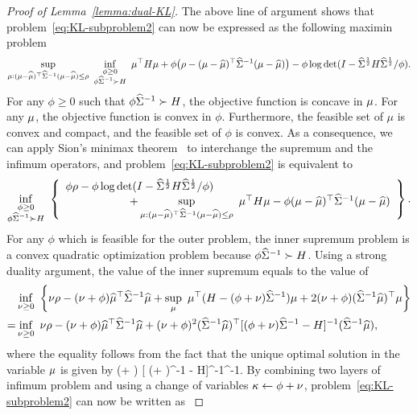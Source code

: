 \documentclass{article}
\begin{document}
\begin{proof}[Proof of Lemma~\ref{lemma:dual-KL}]
	The above line of argument shows that problem~\eqref{eq:KL-subproblem2} can now be expressed as the following maximin problem
	\[
	    \sup\limits_{\mu: (\mu - \widehat {\mu})^\top \widehat{\Sigma}^{-1} (\mu - \widehat {\mu}) \leq \rho} ~ \inf\limits_{\substack{\phi \ge 0 \\ \phi \widehat{\Sigma}^{-1} \succ H }}~ \mu^\top H \mu + \phi \big( \rho - (\mu - \widehat {\mu})^\top \widehat{\Sigma}^{-1} (\mu - \widehat {\mu}) \big) - \phi \log \det (I - \widehat{\Sigma}^{\frac{1}{2}} H \widehat{\Sigma}^{\frac{1}{2}} /\phi).
	\]
	For any $\phi\ge 0$ such that $\phi \widehat{\Sigma}^{-1} \succ H$, the objective function is concave in $\mu$. For any $\mu$, the objective function is convex in $\phi$. Furthermore, the feasible set of $\mu$ is convex and compact, and the feasible set of $\phi$ is convex. As a consequence, we can apply Sion's minimax theorem~\cite{ref:sion1958minimax} to interchange the supremum and the infimum operators, and problem~\eqref{eq:KL-subproblem2} is equivalent to
	\[
	\inf\limits_{\substack{\phi \ge 0 \\ \phi \widehat{\Sigma}^{-1} \succ H }}~\left\{
	\begin{array}{l}
	\phi \rho - \phi \log \det  (I - \widehat{\Sigma}^{\frac{1}{2}} H \widehat{\Sigma}^{\frac{1}{2}} /\phi)  \\
	\hspace{2cm} + \sup\limits_{\mu:(\mu - \widehat {\mu})^\top \widehat{\Sigma}^{-1} (\mu - \widehat {\mu}) \leq \rho} ~ \mu^\top H \mu  - \phi (\mu - \widehat {\mu})^\top \widehat{\Sigma}^{-1} (\mu - \widehat {\mu})
	\end{array}
	\right\}.
	\]
	For any $\phi$ which is feasible for the outer problem, the inner supremum problem is a convex quadratic optimization problem because $ \phi \widehat{\Sigma}^{-1} \succ H$. Using a strong duality argument, the value of the inner supremum equals to the value of
	\begin{align*}
	    &\inf\limits_{\nu \ge 0} ~ \left\{ \nu \rho - (\nu + \phi) \widehat {\mu}^\top \widehat{\Sigma}^{-1} \widehat {\mu} + \sup\limits_{\mu}~ \mu^\top (H - (\phi + \nu) \widehat{\Sigma}^{-1}) \mu + 2 (\nu + \phi) (\widehat{\Sigma}^{-1} \widehat {\mu})^\top \mu \right\}\\
    =& \inf\limits_{\nu \ge 0} ~ \nu \rho - (\nu + \phi) \widehat {\mu}^\top \widehat{\Sigma}^{-1} \widehat {\mu} + (\nu + \phi)^2 (\widehat{\Sigma}^{-1} \widehat {\mu})^\top [(\phi + \nu) \widehat{\Sigma}^{-1} - H]^{-1}  (\widehat{\Sigma}^{-1} \widehat {\mu} ),
	\end{align*}
	where the equality follows from the fact that the unique optimal solution in the variable $\mu$ is given by
	\be \label{eq:unique-mu}
	    (\phi + \nu) [ (\phi + \nu)\covsa^{-1} - H]^{-1}\covsa^{-1}\msa.
	\ee
	By combining two layers of infimum problem and using a change of variables $\kappa \leftarrow \phi + \nu$,  problem~\eqref{eq:KL-subproblem2} can now be written as
	\be \label{eq:KL-subproblem3}

\end{proof}
\end{document}
